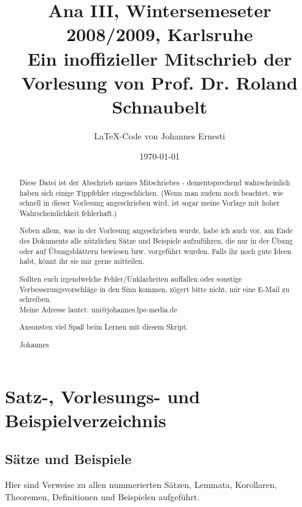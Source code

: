 \documentclass[a4paper]{report}
\title{Ana III, Wintersemeseter 2008/2009, Karlsruhe\\Ein inoffizieller Mitschrieb der Vorlesung von Prof. Dr. Roland Schnaubelt}
\author{\LaTeX-Code von Johannes Ernesti}
\date{\today}
\newcommand{\jhyperref}[2]{\hyperref[j_#1]{#2}}
\newcommand{\jlink}[1]{\jhyperref{#1}{#1}}
\newcommand{\jspace}{\vspace{8pt}}
\theoremstyle{plain}
\theoremstyle{definition}
\begin{document}
\maketitle

\begin{abstract}
    Diese Datei ist der Abschrieb meines Mitschriebes - dementsprechend wahrscheinlich haben sich einige Tippfehler eingeschlichen. (Wenn man zudem noch beachtet, wie schnell in dieser Vorlesung angeschrieben wird, ist sogar meine Vorlage mit hoher Wahrscheinlichkeit fehlerhaft.)
    
    \jspace
    
    Neben allem, was in der Vorlesung angeschrieben wurde, habe ich auch vor, am Ende des Dokuments alle nützlichen Sätze und Beispiele aufzuführen, die nur in der Übung oder auf Übungsblättern bewiesen bzw. vorgeführt wurden. Falls ihr noch gute Ideen habt, könnt ihr sie mir gerne mitteilen.
    
    \jspace
    
    Sollten euch irgendwelche Fehler/Unklarheiten auffallen oder sonstige Verbesserungsvorschläge in den Sinn kommen, zögert bitte nicht, mir eine E-Mail zu schreiben.\\
    Meine Adresse lautet: uni@johannes.lpe-media.de
    
    \jspace
    
    Ansonsten viel Spaß beim Lernen mit diesem Skript.
    
    \jspace
    
    Johannes
\end{abstract}

\clearpage{}
\tableofcontents

\newpage

\section{Satz-, Vorlesungs- und Beispielverzeichnis}

\newcommand{\jtablelink}[1]{\jlink{#1} & \jhyperref{#1}{\pageref{j_#1}}}

\subsection{Sätze und Beispiele}

Hier sind Verweise zu allen nummerierten Sätzen, Lemmata, Korollaren, Theoremen, Definitionen und Beispielen aufgeführt.
\end{document}

